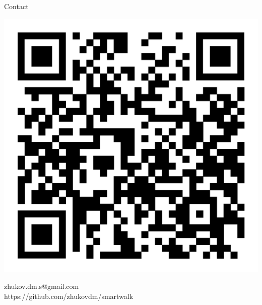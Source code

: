 \documentclass[portrait,a0paper,fontscale=0.25]{baposter}
\begin{document}
\begin{poster}
\begin{posterbox}[column=1, name=contact, below=future, bottomaligned=architecture]{Contact}
\begin{minipage}{1.00\textwidth}
\begin{minipage}{0.10\textwidth}
\includegraphics[width=1.00\linewidth]{./img/poster/qr.pdf}
\end{minipage}
\hfill
\begin{minipage}{0.885\textwidth}
zhukov.dm.s@gmail.com \\
https://github.com/zhukovdm/smartwalk
\end{minipage}
\end{minipage}
\end{posterbox}

\end{poster}
\end{document}
